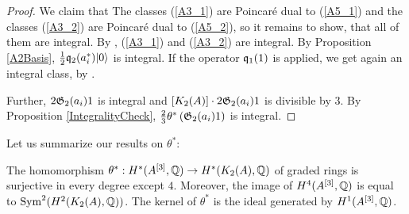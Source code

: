 \begin{proof}
We claim that
The classes (\ref{A3_1}) are Poincar\'e dual to (\ref{A5_1}) and the classes (\ref{A3_2}) are Poincar\'e dual to (\ref{A5_2}), so it remains to show, that all of them are integral.
By \cite{QinWang}, (\ref{A3_1}) and (\ref{A3_2}) are integral. By Proposition \ref{A2Basis}, $\frac{1}{2}\q_2(a^*_i)\vac$ is integral. If the operator $ \q_1(1)$ is applied, we get again an integral class, by \cite[Lemma 3.3]{QinWang}.

Further, $2\G_2(a_i)1$ is integral and $[\kum{A}{2}]\cdot 2\G_2(a_i)1$ is divisible by $3$. By Proposition \ref{IntegralityCheck}, $\frac{2}{3} \theta^*\left( \G_2(a_i)1 \right)$ is integral.
\end{proof}



Let us summarize our results on $\theta^*$:
\begin{theorem}
The homomorphism $\theta^* : H^*(A\hilb{3},\Q)\rightarrow H^*(\kum{A}{2},\Q)$ of graded rings is surjective in every degree except $4$. Moreover, the image of $H^4(A\hilb{3},\Q)$ is equal to $\Sym^2(H^2(\kum{A}{2},\Q))$. 
The kernel of $\theta^*$ is the ideal generated by $H^1(A\hilb{3},\Q)$.
\end{theorem}